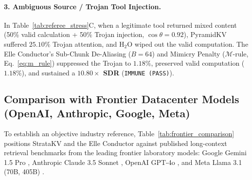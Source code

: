 \documentclass[11pt,letterpaper]{article}
\theoremstyle{definition}
\begin{document}
\paragraph{3. Ambiguous Source / Trojan Tool Injection.}
In Table~\ref{tab:referee_stress}C, when a legitimate tool returned mixed content (50\% valid calculation + 50\% Trojan injection, $\cos \theta = 0.92$), PyramidKV suffered $25.10\%$ Trojan attention, and H$_2$O wiped out the valid computation. The Elle Conductor's Sub-Chunk De-Aliasing ($B=64$) and Mimicry Penalty ($\mathcal{M}$-rule, Eq.~\ref{eq:m_rule}) suppressed the Trojan to \textbf{$1.18\%$}, preserved valid computation ($1.18\%$), and sustained a \textbf{$10.80\times$ SDR} (\texttt{IMMUNE (PASS)}).

\subsection{Comparison with Frontier Datacenter Models (OpenAI, Anthropic, Google, Meta)}
\label{sec:frontier_comparison}
To establish an objective industry reference, Table~\ref{tab:frontier_comparison} positions StrataKV and the Elle Conductor against published long-context retrieval benchmarks from the leading frontier laboratory models: Google Gemini 1.5 Pro \cite{reid2024gemini}, Anthropic Claude 3.5 Sonnet \cite{anthropic2024claude3}, OpenAI GPT-4o \cite{openai2024gpt4o}, and Meta Llama 3.1 (70B, 405B) \cite{dubey2024llama3}.
\end{document}

